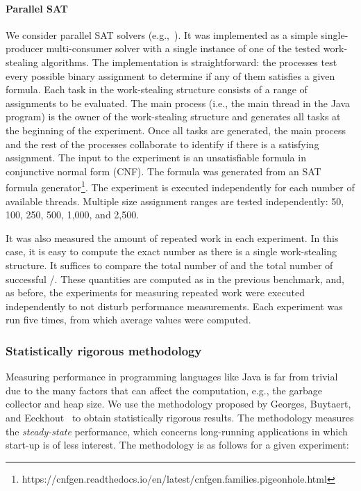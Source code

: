 \paragraph*{Parallel SAT}
We consider parallel SAT solvers (e.g.,~\cite{DBLP_journals_amai_BohmS96, DBLP_journals_entcs_FeldmanDH05, DBLP_books_sp_HS2018}). It was implemented as a simple single-producer multi-consumer solver with a single instance of one of the tested work-stealing algorithms. The implementation is straightforward: the processes test every possible binary assignment to determine if any of them satisfies a given formula. Each task in the work-stealing structure consists of a range of assignments to be evaluated.  The main process (i.e., the main thread in the Java program) is the owner of the work-stealing structure and generates all tasks at the beginning of the experiment. Once all tasks are generated, the main process and the rest of the processes collaborate to identify if there is a satisfying assignment.  The input to the experiment is an unsatisfiable formula in conjunctive normal form (CNF). The formula was generated from an SAT formula generator\footnote{https://cnfgen.readthedocs.io/en/latest/cnfgen.families.pigeonhole.html}.  The experiment is executed independently for each number of available threads.  Multiple size assignment ranges are tested independently: 50, 100, 250, 500, 1,000, and 2,500.

It was also measured the amount of repeated work in each experiment.  In this case, it is easy to compute the exact number as there is a single work-stealing structure. It suffices to compare the total number of \Puts and the total number of successful \Takes/\Steals. These quantities are computed as in the previous benchmark, and, as before, the experiments for measuring repeated work were executed independently to not disturb performance measurements. Each experiment was run five times, from which average values were computed.


\subsubsection{\label{sec:stat-rigor-meth}Statistically rigorous methodology}

Measuring performance in programming languages like Java is far from trivial due to the many factors that can affect the computation, e.g., the garbage collector and heap size. We use the methodology proposed by Georges, Buytaert, and Eeckhout~\cite{DBLP_conf_oopsla_GeorgesBE07} to obtain statistically rigorous results. The methodology measures the \textit{steady-state} performance, which concerns long-running applications in which start-up is of less interest. The methodology is as follows for a given experiment:


